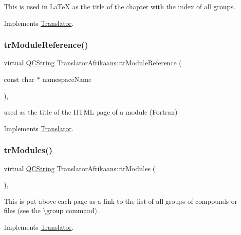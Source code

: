 This is used in La\+TeX as the title of the chapter with the index of all groups. 

Implements \mbox{\hyperlink{class_translator}{Translator}}.

\mbox{\label{class_translator_afrikaans_a518151425fa829f3f377381ab4006843}} 
\subsubsection{\texorpdfstring{trModuleReference()}{trModuleReference()}}
{\footnotesize\ttfamily virtual \mbox{\hyperlink{class_q_c_string}{Q\+C\+String}} Translator\+Afrikaans\+::tr\+Module\+Reference (\begin{DoxyParamCaption}\item[{const char $\ast$}]{namespace\+Name }\end{DoxyParamCaption})\hspace{0.3cm}{\ttfamily [inline]}, {\ttfamily [virtual]}}

used as the title of the H\+T\+ML page of a module (Fortran) 

Implements \mbox{\hyperlink{class_translator}{Translator}}.

\mbox{\label{class_translator_afrikaans_aea743e3c64eff6ce982f0fce0c0e8c55}} 
\subsubsection{\texorpdfstring{trModules()}{trModules()}}
{\footnotesize\ttfamily virtual \mbox{\hyperlink{class_q_c_string}{Q\+C\+String}} Translator\+Afrikaans\+::tr\+Modules (\begin{DoxyParamCaption}{ }\end{DoxyParamCaption})\hspace{0.3cm}{\ttfamily [inline]}, {\ttfamily [virtual]}}

This is put above each page as a link to the list of all groups of compounds or files (see the \textbackslash{}group command). 

Implements \mbox{\hyperlink{class_translator}{Translator}}.

